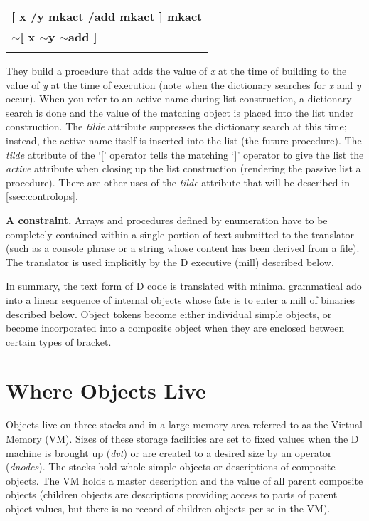 \begin{tabular}{>{\sffamily\bfseries}l}
 [ x /y mkact /add mkact ] mkact \\
 $\sim$[ x $\sim$y $\sim$add ] \\\\
\end{tabular}

They build a procedure that adds the value of \emph{x} at the time of building to the value of \emph{y} at the time of execution (note when the dictionary searches for \emph{x} and \emph{y} occur). When you refer to an active name during list construction, a dictionary search is done and the value of the matching object is placed into the list under construction. The \emph{tilde} attribute suppresses the dictionary search at this time; instead, the active name itself is inserted into the list (the future procedure). The \emph{tilde} attribute of the `[' operator tells the matching `]' operator to give the list the \emph{active} attribute when closing up the list construction (rendering the passive list a procedure). There are other uses of the \emph{tilde} attribute that will be described in \ref{ssec:controlops}.  

\textbf{A constraint. }Arrays  and  procedures  defined by enumeration have  to  be  completely contained  within a single portion of text submitted to  the  translator (such as a console phrase or a string whose content has been derived from a file). The  translator  is used implicitly by the D executive  (mill)  described below.

In  summary, the  text  form  of D  code  is  translated  with  minimal grammatical ado into a linear sequence of internal objects whose fate is to enter a mill of binaries described below. Object tokens become  either individual simple objects,  or become incorporated into  a composite  object  when  they  are  enclosed  between  certain  types  of bracket. 

\section{Where Objects Live}\label{sec:whereobjects}

Objects  live  on  three stacks and in  a  large  memory  area referred to as the Virtual Memory (VM). Sizes of these storage facilities are set to fixed values when the D machine is brought up (\emph{dvt}) or are created to a desired size by an operator (\emph{dnodes}).  The stacks  hold  whole simple  objects  or descriptions of composite objects.  The  VM  holds  a master  description  and  the  value of  all  parent composite objects (children objects are descriptions providing access to parts of parent object values, but there is no record of children objects per se in the VM).

